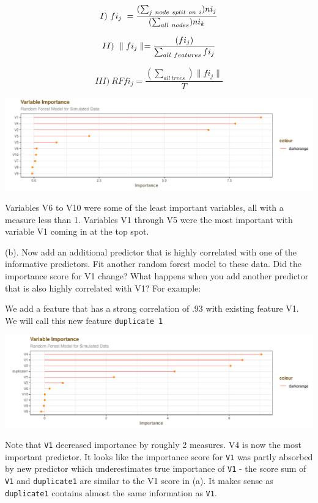 \documentclass[]{report}
\begin{document}
\[
I) \  fi_j \ =\frac{ (\sum_{j \ node \ split \ on \ i}) ni_j }{ ( \sum_{all \ nodes}) ni_k}\\
\]

\[
II) \  \parallel  fi_j  \parallel = \frac{(fi_j)}{\sum_{all \ features}fi_j} \\
\]

\[
III) \ RFfi_j= \frac{ ( \sum_{all \ trees})\parallel  fi_j \parallel}{T}
\]

\includegraphics{Homework-Two_files/figure-latex/kj-8.1a-1.pdf}

Variables V6 to V10 were some of the least important variables, all with
a measure less than 1. Variables V1 through V5 were the most important
with variable V1 coming in at the top spot.

\begin{subquestion}{(b).} Now add an additional predictor that is highly correlated with one of the informative predictors. Fit another random forest model to these data. Did the importance score for V1 change? What happens when you add another predictor that is also highly correlated with V1? For example:\end{subquestion}

We add a feature that has a strong correlation of .93 with existing
feature V1. We will call this new feature \texttt{duplicate\ 1}

\includegraphics{Homework-Two_files/figure-latex/kj-8.1b-1.pdf}

Note that \texttt{V1} decreased importance by roughly 2 measures. V4 is
now the most important predictor. It looks like the importance score for
\texttt{V1} was partly absorbed by new predictor which underestimates
true importance of \texttt{V1} - the score sum of \texttt{V1} and
\texttt{duplicate1} are similar to the V1 score in (a). It makes sense
as \texttt{duplicate1} contains almost the same information as
\texttt{V1}.
\end{document}
